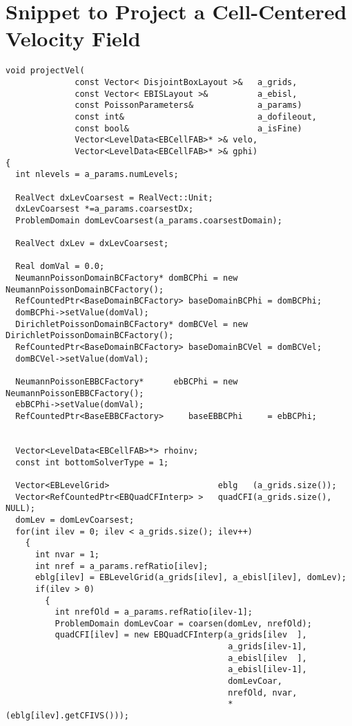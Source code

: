 \section{Snippet to Project a Cell-Centered Velocity Field}
\begin{small}\begin{verbatim}
void projectVel(
              const Vector< DisjointBoxLayout >&   a_grids, 
              const Vector< EBISLayout >&          a_ebisl, 
              const PoissonParameters&             a_params)
              const int&                           a_dofileout,
              const bool&                          a_isFine)
              Vector<LevelData<EBCellFAB>* >& velo,
              Vector<LevelData<EBCellFAB>* >& gphi)
{
  int nlevels = a_params.numLevels;

  RealVect dxLevCoarsest = RealVect::Unit;
  dxLevCoarsest *=a_params.coarsestDx;
  ProblemDomain domLevCoarsest(a_params.coarsestDomain);

  RealVect dxLev = dxLevCoarsest;

  Real domVal = 0.0;
  NeumannPoissonDomainBCFactory* domBCPhi = new NeumannPoissonDomainBCFactory();
  RefCountedPtr<BaseDomainBCFactory> baseDomainBCPhi = domBCPhi;
  domBCPhi->setValue(domVal);
  DirichletPoissonDomainBCFactory* domBCVel = new DirichletPoissonDomainBCFactory();
  RefCountedPtr<BaseDomainBCFactory> baseDomainBCVel = domBCVel;
  domBCVel->setValue(domVal);

  NeumannPoissonEBBCFactory*      ebBCPhi = new NeumannPoissonEBBCFactory();
  ebBCPhi->setValue(domVal);
  RefCountedPtr<BaseEBBCFactory>     baseEBBCPhi     = ebBCPhi;


  Vector<LevelData<EBCellFAB>*> rhoinv;
  const int bottomSolverType = 1;
  
  Vector<EBLevelGrid>                      eblg   (a_grids.size()); 
  Vector<RefCountedPtr<EBQuadCFInterp> >   quadCFI(a_grids.size(), NULL);
  domLev = domLevCoarsest;
  for(int ilev = 0; ilev < a_grids.size(); ilev++)
    {
      int nvar = 1;
      int nref = a_params.refRatio[ilev];
      eblg[ilev] = EBLevelGrid(a_grids[ilev], a_ebisl[ilev], domLev);
      if(ilev > 0)
        {
          int nrefOld = a_params.refRatio[ilev-1];
          ProblemDomain domLevCoar = coarsen(domLev, nrefOld);
          quadCFI[ilev] = new EBQuadCFInterp(a_grids[ilev  ],
                                             a_grids[ilev-1],
                                             a_ebisl[ilev  ],
                                             a_ebisl[ilev-1],
                                             domLevCoar,
                                             nrefOld, nvar,
                                             *(eblg[ilev].getCFIVS()));
          

\end{verbatim}
\end{small}

